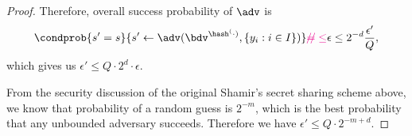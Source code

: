 \documentclass[envcountsame,runningheads,notitlepage]{llncs}
\begin{document}
\begin{proof}
		Therefore, overall success probability of $\adv$ is 
		\begin{equation*}
			\condprob{s' = s}{s' \leftarrow \adv(\bdv^{\hash^(\cdot)}, \{y_i: i \in I\})} \changedmx{=}{\leq} \epsilon \leq 2^{-d}\frac{\epsilon'}{Q},
		\end{equation*}
		which gives us $\epsilon' \leq Q \cdot 2^{d} \cdot \epsilon$.
		
		From the security discussion of the original Shamir's secret sharing scheme above, we know that probability of a random guess is $2^{-m}$, which is the best probability that any unbounded adversary succeeds. Therefore we have $\epsilon' \leq Q \cdot 2^{-m+d}$.
		
	\end{proof}
	 
	 
	
	
	
	
\end{document}
